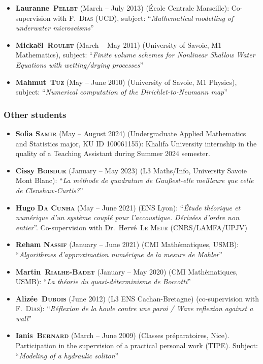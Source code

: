 \documentclass[final, a4paper, oneside, 12pt]{article}
\numberwithin{equation}{section}
\begin{document}
\begin{itemize}
  \item \textbf{Lauranne~\textsc{Pellet}} (March -- July 2013) (\'Ecole Centrale Marseille): Co-supervision with F.~\textsc{Dias} (UCD), subject: ``\textit{Mathematical modelling of underwater microseisms}''

  \item \textbf{Micka\"el~\textsc{Roulet}} (March -- May 2011) (University of Savoie, M1 Mathematics), subject: ``\textit{Finite volume schemes for Nonlinear Shallow Water Equations with wetting/drying processes}''

  \item \textbf{Mahmut~\textsc{Tuz}} (May -- June 2010) (University of Savoie, M1 Physics), subject: ``\textit{Numerical computation of the Dirichlet-to-Neumann map}''

\end{itemize}

\subsubsection{Other students}

\begin{itemize}

  \item \textbf{Sofia \textsc{Samir}} (May -- August 2024) (Undergraduate Applied Mathematics and Statistics major, KU ID 100061155): Khalifa University internship in the quality of a Teaching Assistant during Summer 2024 semester.

  \item \textbf{Cissy \textsc{Boisdur}} (January -- May 2023) (L3 Maths/Info, University Savoie Mont Blanc): ``\textit{La m\'ethode de quadrature de Gau\ss est-elle meilleure que celle de Clenshaw-Curtis?}''

  \item \textbf{Hugo \textsc{Da Cunha}} (May -- June 2021) (ENS Lyon): ``\textit{\'Etude th\'eorique et num\'erique d'un syst\`eme coupl\'e pour l'accoustique. D\'eriv\'ees d'ordre non entier}''. Co-supervision with Dr.~Herv\'e~\textsc{Le Meur} (CNRS/LAMFA/UPJV)

  \item \textbf{Reham \textsc{Nassif}} (January -- June 2021) (CMI Math\'ematiques, USMB): ``\textit{Algorithmes d'approximation num\'erique de la mesure de Mahler}''

  \item \textbf{Martin~\textsc{Rialhe-Badet}} (January -- May 2020) (CMI Math\'ematiques, USMB): ``\textit{La th\'eorie du quasi-d\'eterminisme de Boccotti}''

  \item \textbf{Aliz\'ee~\textsc{Dubois}} (June 2012) (L3 ENS Cachan-Bretagne) (co-supervision with F.~\textsc{Dias}): ``\textit{R\'eflexion de la houle contre une paroi / Wave reflexion against a wall}''

  \item \textbf{Ianis~\textsc{Bernard}} (March -- June 2009) (Classes pr\'eparatoires, Nice). Participation in the supervision of a practical personal work (TIPE). Subject: ``\textit{Modeling of a hydraulic soliton}''
  
\end{itemize}
\end{document}
